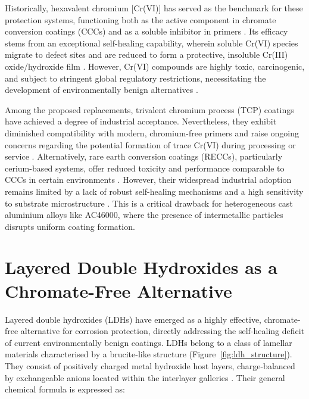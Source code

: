 \documentclass[11pt,twoside,a4paper,final]{report}
\begin{document}
Historically, hexavalent chromium [Cr(VI)] has served as the benchmark for these protection systems, functioning both as the active component in chromate conversion coatings (CCCs) and as a soluble inhibitor in primers \cite{Beneke2016, BoualiReview2020}. Its efficacy stems from an exceptional self-healing capability, wherein soluble Cr(VI) species migrate to defect sites and are reduced to form a protective, insoluble Cr(III) oxide/hydroxide film \cite{BoualiReview2020}. However, Cr(VI) compounds are highly toxic, carcinogenic, and subject to stringent global regulatory restrictions, necessitating the development of environmentally benign alternatives \cite{MartinezViademonte2020, BoualiReview2020}.

Among the proposed replacements, trivalent chromium process (TCP) coatings have achieved a degree of industrial acceptance. Nevertheless, they exhibit diminished compatibility with modern, chromium-free primers and raise ongoing concerns regarding the potential formation of trace Cr(VI) during processing or service \cite{Becker2019, Qi2015, BoualiReview2020}. Alternatively, rare earth conversion coatings (RECCs), particularly cerium-based systems, offer reduced toxicity and performance comparable to CCCs in certain environments \cite{Becker2019, Hughes2009}. However, their widespread industrial adoption remains limited by a lack of robust self-healing mechanisms and a high sensitivity to substrate microstructure \cite{Becker2019,Sainis2020}. This is a critical drawback for heterogeneous cast aluminium alloys like AC46000, where the presence of intermetallic particles disrupts uniform coating formation.

\section{Layered Double Hydroxides as a Chromate-Free Alternative}
\label{sec:LDH}

Layered double hydroxides (LDHs) have emerged as a highly effective, chromate-free alternative for corrosion protection, directly addressing the self-healing deficit of current environmentally benign coatings. LDHs belong to a class of lamellar materials characterised by a brucite-like structure (Figure~\ref{fig:ldh_structure}). They consist of positively charged metal hydroxide host layers, charge-balanced by exchangeable anions located within the interlayer galleries \cite{Bouali2020, Zhou2017, He2020, Iuzviuk2020, Cao2022}. Their general chemical formula is expressed as:
\end{document}
